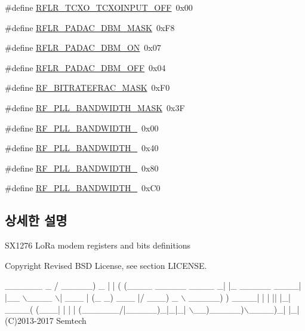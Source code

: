 \begin{DoxyCompactItemize}
\#define \mbox{\hyperlink{sx1276_regs-_lo_ra_8h_a248c5dfb7c8e38ef7005ba6fdcfe94ca}{R\+F\+L\+R\+\_\+\+T\+C\+X\+O\+\_\+\+T\+C\+X\+O\+I\+N\+P\+U\+T\+\_\+\+O\+FF}}~0x00
\item 
\#define \mbox{\hyperlink{sx1276_regs-_lo_ra_8h_a56956e6af4645664d25bd3cc40a3a477}{R\+F\+L\+R\+\_\+\+P\+A\+D\+A\+C\+\_\+D\+B\+M\+\_\+\+M\+A\+SK}}~0x\+F8
\item 
\#define \mbox{\hyperlink{sx1276_regs-_lo_ra_8h_a9e1e9d92a5d04b4c5ffcca9dde04cc7e}{R\+F\+L\+R\+\_\+\+P\+A\+D\+A\+C\+\_\+D\+B\+M\+\_\+\+ON}}~0x07
\item 
\#define \mbox{\hyperlink{sx1276_regs-_lo_ra_8h_a16791519b3052ba77fcc3bd3b1112fa2}{R\+F\+L\+R\+\_\+\+P\+A\+D\+A\+C\+\_\+D\+B\+M\+\_\+\+O\+FF}}~0x04
\item 
\#define \mbox{\hyperlink{sx1276_regs-_lo_ra_8h_a15a3a7765ab924197cdf57cbe3fc1160}{R\+F\+\_\+\+B\+I\+T\+R\+A\+T\+E\+F\+R\+A\+C\+\_\+\+M\+A\+SK}}~0x\+F0
\item 
\#define \mbox{\hyperlink{sx1276_regs-_lo_ra_8h_aac01efdf312f6264cbd8b48d6c94e0ea}{R\+F\+\_\+\+P\+L\+L\+\_\+\+B\+A\+N\+D\+W\+I\+D\+T\+H\+\_\+\+M\+A\+SK}}~0x3F
\item 
\#define \mbox{\hyperlink{sx1276_regs-_lo_ra_8h_afdfab4acc3525e87ce252cbf593c3255}{R\+F\+\_\+\+P\+L\+L\+\_\+\+B\+A\+N\+D\+W\+I\+D\+T\+H\+\_}}~0x00
\item 
\#define \mbox{\hyperlink{sx1276_regs-_lo_ra_8h_acb5d72344cac01094235aaf62ac05399}{R\+F\+\_\+\+P\+L\+L\+\_\+\+B\+A\+N\+D\+W\+I\+D\+T\+H\+\_}}~0x40
\item 
\#define \mbox{\hyperlink{sx1276_regs-_lo_ra_8h_aa5f41821cba4e1c23b0cf8b6eb05d021}{R\+F\+\_\+\+P\+L\+L\+\_\+\+B\+A\+N\+D\+W\+I\+D\+T\+H\+\_}}~0x80
\item 
\#define \mbox{\hyperlink{sx1276_regs-_lo_ra_8h_ae1e12342489e52885c9de6812079d6e8}{R\+F\+\_\+\+P\+L\+L\+\_\+\+B\+A\+N\+D\+W\+I\+D\+T\+H\+\_}}~0x\+C0
\end{DoxyCompactItemize}


\subsection{상세한 설명}
S\+X1276 Lo\+Ra modem registers and bits definitions 

\begin{DoxyCopyright}{Copyright}
Revised B\+SD License, see section L\+I\+C\+E\+N\+SE.
\end{DoxyCopyright}

\begin{DoxyCode}
  \_\_\_\_\_\_                              \_
 / \_\_\_\_\_)             \_              | |
( (\_\_\_\_  \_\_\_\_\_ \_\_\_\_ \_| |\_ \_\_\_\_\_  \_\_\_\_| |\_\_
 \(\backslash\)\_\_\_\_ \(\backslash\)| \_\_\_ |    (\_   \_) \_\_\_ |/ \_\_\_)  \_ \(\backslash\)
 \_\_\_\_\_) ) \_\_\_\_| | | || |\_| \_\_\_\_( (\_\_\_| | | |
(\_\_\_\_\_\_/|\_\_\_\_\_)\_|\_|\_| \(\backslash\)\_\_)\_\_\_\_\_)\(\backslash\)\_\_\_\_)\_| |\_|
(C)2013-2017 Semtech
\end{DoxyCode}


